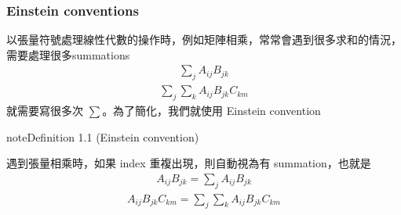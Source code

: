 \documentclass[letterpaper,10pt,english]{jupyterBook}
\begin{document}
\subsubsection{Einstein conventions}
\label{\detokenize{va/vec_alge:einstein-conventions}}
\sphinxAtStartPar
以張量符號處理線性代數的操作時，例如矩陣相乘，常常會遇到很多求和的情況，需要處理很多summations
\begin{equation*}
\begin{split}\sum_{j}A_{ij}B_{jk} \end{split}
\end{equation*}\begin{equation*}
\begin{split}\sum_{j}\sum_{k}A_{ij}B_{jk}C_{km}\end{split}
\end{equation*}
\sphinxAtStartPar
就需要寫很多次 \(\sum\)。為了簡化，我們就使用 Einstein convention
\label{va/vec_alge:definition-0}
\begin{sphinxadmonition}{note}{Definition 1.1 (Einstein convention)}



\sphinxAtStartPar
遇到張量相乘時，如果 index 重複出現，則自動視為有 summation，也就是
\begin{equation*}
\begin{split}A_{ij}B_{jk}=\sum_{j}A_{ij}B_{jk}\end{split}
\end{equation*}\begin{equation*}
\begin{split}A_{ij}B_{jk}C_{km}=\sum_{j}\sum_{k}A_{ij}B_{jk}C_{km}\end{split}
\end{equation*}\end{sphinxadmonition}
 \label{exercise:exer_ten}
\end{document}
